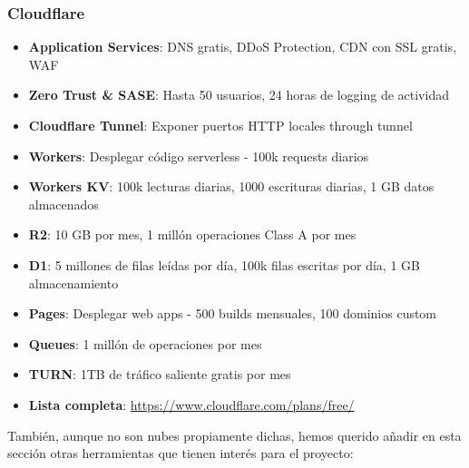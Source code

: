 \subsubsection*{Cloudflare}
\begin{itemize}
	\item \textbf{Application Services}: DNS gratis, DDoS Protection, CDN con SSL gratis, WAF
	\item \textbf{Zero Trust \& SASE}: Hasta 50 usuarios, 24 horas de logging de actividad
	\item \textbf{Cloudflare Tunnel}: Exponer puertos HTTP locales through tunnel
	\item \textbf{Workers}: Desplegar código serverless - 100k requests diarios
	\item \textbf{Workers KV}: 100k lecturas diarias, 1000 escrituras diarias, 1 GB datos almacenados
	\item \textbf{R2}: 10 GB por mes, 1 millón operaciones Class A por mes
	\item \textbf{D1}: 5 millones de filas leídas por día, 100k filas escritas por día, 1 GB almacenamiento
	\item \textbf{Pages}: Desplegar web apps - 500 builds mensuales, 100 dominios custom
	\item \textbf{Queues}: 1 millón de operaciones por mes
	\item \textbf{TURN}: 1TB de tráfico saliente gratis por mes
	\item \textbf{Lista completa}: \url{https://www.cloudflare.com/plans/free/}
\end{itemize}

También, aunque no son nubes propiamente dichas, hemos querido añadir en esta sección otras herramientas que tienen interés para el proyecto:

